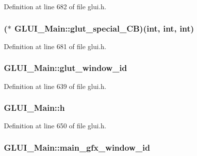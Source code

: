Definition at line 682 of file glui.\+h.

\hypertarget{class_g_l_u_i___main_aa50303a909f39a7b28cfdf076cc848a4}{
\subsubsection[{glut\+\_\+special\+\_\+\+C\+B}]{($\ast$ G\+L\+U\+I\+\_\+\+Main\+::glut\+\_\+special\+\_\+\+C\+B)({\bf int}, {\bf int}, {\bf int})\hspace{0.3cm}{\ttfamily [protected]}}}\label{class_g_l_u_i___main_aa50303a909f39a7b28cfdf076cc848a4}


Definition at line 681 of file glui.\+h.

\hypertarget{class_g_l_u_i___main_a4c2cd2330267eca938028a8a6fcb6382}{
\subsubsection[{glut\+\_\+window\+\_\+id}]{ G\+L\+U\+I\+\_\+\+Main\+::glut\+\_\+window\+\_\+id\hspace{0.3cm}{\ttfamily [protected]}}}\label{class_g_l_u_i___main_a4c2cd2330267eca938028a8a6fcb6382}


Definition at line 639 of file glui.\+h.

\hypertarget{class_g_l_u_i___main_a7c5cd9db296247eceb52c2aa84448e0f}{
\subsubsection[{h}]{ G\+L\+U\+I\+\_\+\+Main\+::h\hspace{0.3cm}{\ttfamily [protected]}}}\label{class_g_l_u_i___main_a7c5cd9db296247eceb52c2aa84448e0f}


Definition at line 650 of file glui.\+h.

\hypertarget{class_g_l_u_i___main_a43cd4a18026504db98178d766d18a78c}{
\subsubsection[{main\+\_\+gfx\+\_\+window\+\_\+id}]{ G\+L\+U\+I\+\_\+\+Main\+::main\+\_\+gfx\+\_\+window\+\_\+id\hspace{0.3cm}{\ttfamily [protected]}}}\label{class_g_l_u_i___main_a43cd4a18026504db98178d766d18a78c}


